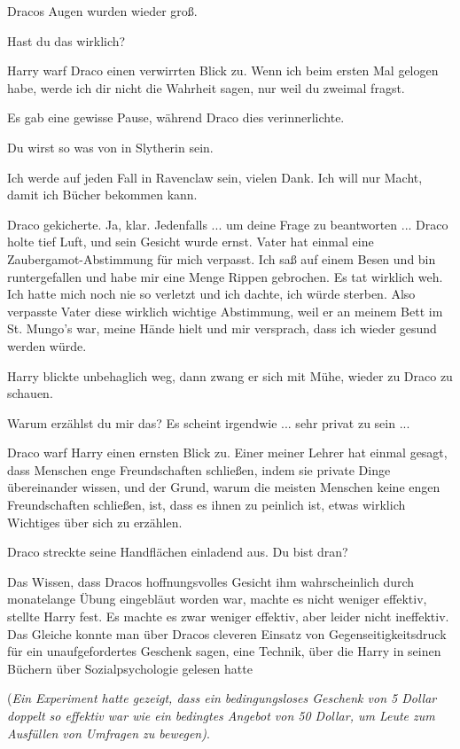 Dracos Augen wurden wieder groß.

\glqq{}Hast du das wirklich?\grqq{}

Harry warf Draco einen verwirrten Blick zu. \glqq{}Wenn ich beim ersten Mal
gelogen habe, werde ich dir nicht die Wahrheit sagen, nur weil du zweimal
fragst.\grqq{}

Es gab eine gewisse Pause, während Draco dies verinnerlichte.

\glqq{}Du wirst so was von in Slytherin sein.\grqq{}

\glqq{}Ich werde auf jeden Fall in Ravenclaw sein, vielen Dank. Ich will nur
Macht, damit ich Bücher bekommen kann.\grqq{}

Draco gekicherte. \glqq{}Ja, klar. Jedenfalls ... um deine Frage zu beantworten
...\grqq{} Draco holte tief Luft, und sein Gesicht wurde ernst. \glqq{}Vater hat
einmal eine Zaubergamot-Abstimmung für mich verpasst. Ich saß auf einem Besen
und bin runtergefallen und habe mir eine Menge Rippen gebrochen. Es tat wirklich
weh. Ich hatte mich noch nie so verletzt und ich dachte, ich würde sterben. Also
verpasste Vater diese wirklich wichtige Abstimmung, weil er an meinem Bett im
St. Mungo's war, meine Hände hielt und mir versprach, dass ich wieder gesund
werden würde.\grqq{}

Harry blickte unbehaglich weg, dann zwang er sich mit Mühe, wieder zu Draco zu
schauen.

\glqq{}Warum erzählst du mir das? Es scheint irgendwie ... sehr privat zu sein
...\grqq{}

Draco warf Harry einen ernsten Blick zu. \glqq{}Einer meiner Lehrer hat einmal
gesagt, dass Menschen enge Freundschaften schließen, indem sie private Dinge
übereinander wissen, und der Grund, warum die meisten Menschen keine engen
Freundschaften schließen, ist, dass es ihnen zu peinlich ist, etwas wirklich
Wichtiges über sich zu erzählen.\grqq{}

Draco streckte seine Handflächen einladend aus. \glqq{}Du bist dran?\grqq{}

Das Wissen, dass Dracos hoffnungsvolles Gesicht ihm wahrscheinlich durch
monatelange Übung eingebläut worden war, machte es nicht weniger effektiv,
stellte Harry fest. Es machte es zwar weniger effektiv, aber leider nicht
ineffektiv. Das Gleiche konnte man über Dracos cleveren Einsatz von
Gegenseitigkeitsdruck für ein unaufgefordertes Geschenk sagen, eine Technik,
über die Harry in seinen Büchern über Sozialpsychologie gelesen hatte

(\emph{Ein Experiment hatte gezeigt, dass ein bedingungsloses Geschenk von 5
Dollar doppelt so effektiv war wie ein bedingtes Angebot von 50 Dollar, um Leute
zum Ausfüllen von Umfragen zu bewegen)}.

